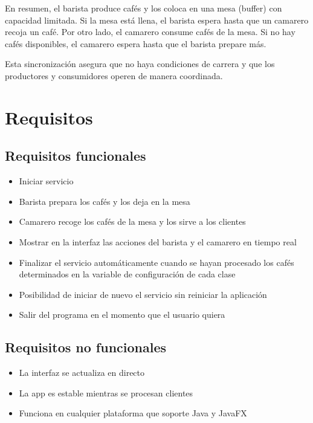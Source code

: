 \documentclass[14pt]{extarticle}
\begin{document}
        \vspace{0.3cm}
        En resumen, el barista produce cafés y los coloca en una mesa (buffer) con capacidad limitada. Si la mesa está llena, el barista espera hasta que un camarero recoja un café. Por otro lado, el camarero consume cafés de la mesa. Si no hay cafés disponibles, el camarero espera hasta que el barista prepare más.

        \vspace{0.3cm}
        \begin{tcolorbox}
            [colback=blue!5!white,colframe=blue!50!black,fonttitle=\bfseries]
            Esta sincronización asegura que no haya condiciones de carrera y que los productores y consumidores operen de manera coordinada.
        \end{tcolorbox}
        

 

    \newpage    
    \section{Requisitos}

        \subsection{Requisitos funcionales}
            \begin{itemize}
                \item Iniciar servicio
                \item Barista prepara los cafés y los deja en la mesa
                \item Camarero recoge los cafés de la mesa y los sirve a los clientes
                \item Mostrar en la interfaz las acciones del barista y el camarero en tiempo real
                \item Finalizar el servicio automáticamente cuando se hayan procesado los cafés determinados en la variable de configuración de cada clase
                \item Posibilidad de iniciar de nuevo el servicio sin reiniciar la aplicación
                \item Salir del programa en el momento que el usuario quiera
            \end{itemize}

        \subsection{Requisitos no funcionales}
            \begin{itemize}
                \item La interfaz se actualiza en directo
                \item La app es estable mientras se procesan clientes
                \item Funciona en cualquier plataforma que soporte Java y JavaFX
            \end{itemize}
\end{document}
